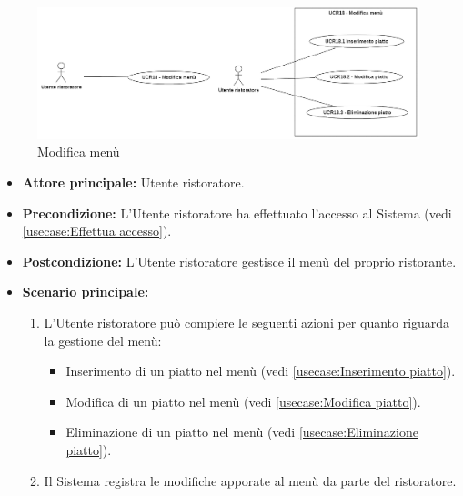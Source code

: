 
\label{usecase:Modifica menù}


\begin{figure}[h]
	\centering
	\includegraphics[width=0.99\textwidth]{./uml/UCR18.png} 
	\caption{Modifica menù}
	\label{fig:UCR18}
  \end{figure}

\begin{itemize}
	\item \textbf{Attore principale:} Utente ristoratore.

	\item \textbf{Precondizione:} L'Utente ristoratore ha effettuato l'accesso al Sistema (vedi \autoref{usecase:Effettua accesso}).

	\item \textbf{Postcondizione:} L'Utente ristoratore gestisce il menù del proprio ristorante.


	\item \textbf{Scenario principale:}
	      \begin{enumerate}

		      \item L'Utente ristoratore può compiere le seguenti azioni per quanto riguarda la gestione del menù:
		      \begin{itemize}
                \item Inserimento di un piatto nel menù (vedi \autoref{usecase:Inserimento piatto}).
                \item Modifica di un piatto nel menù (vedi \autoref{usecase:Modifica piatto}).
                \item Eliminazione di un piatto nel menù (vedi \autoref{usecase:Eliminazione piatto}).
              \end{itemize}
		      \item Il Sistema registra le modifiche apporate al menù da parte del ristoratore.

	      \end{enumerate}
\end{itemize}

